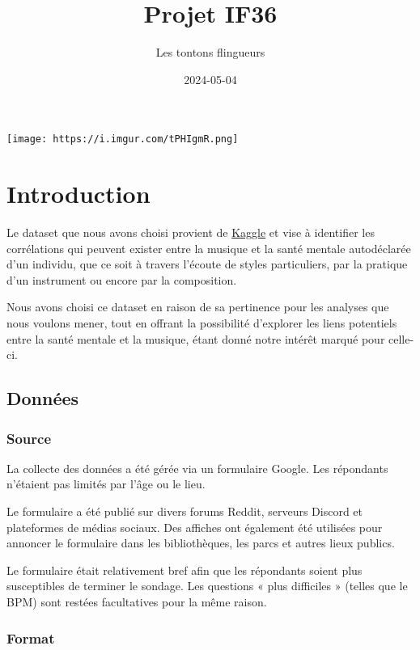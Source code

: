 \documentclass[
]{article}
\title{Projet IF36}
\author{Les tontons flingueurs}
\date{2024-05-04}
\begin{document}
\maketitle

\texttt{[image: https://i.imgur.com/tPHIgmR.png]}

\section{Introduction}\label{introduction}

Le dataset que nous avons choisi provient de
\href{https://www.kaggle.com/datasets/catherinerasgaitis/mxmh-survey-results/data}{Kaggle}
et vise à identifier les corrélations qui peuvent exister entre la
musique et la santé mentale autodéclarée d'un individu, que ce soit à
travers l'écoute de styles particuliers, par la pratique d'un instrument
ou encore par la composition.

Nous avons choisi ce dataset en raison de sa pertinence pour les
analyses que nous voulons mener, tout en offrant la possibilité
d'explorer les liens potentiels entre la santé mentale et la musique,
étant donné notre intérêt marqué pour celle-ci.

\subsection{Données}\label{donnuxe9es}

\subsubsection{Source}\label{source}

La collecte des données a été gérée via un formulaire Google. Les
répondants n'étaient pas limités par l'âge ou le lieu.

Le formulaire a été publié sur divers forums Reddit, serveurs Discord et
plateformes de médias sociaux. Des affiches ont également été utilisées
pour annoncer le formulaire dans les bibliothèques, les parcs et autres
lieux publics.

Le formulaire était relativement bref afin que les répondants soient
plus susceptibles de terminer le sondage. Les questions « plus
difficiles » (telles que le BPM) sont restées facultatives pour la même
raison.

\subsubsection{Format}\label{format}
\end{document}
